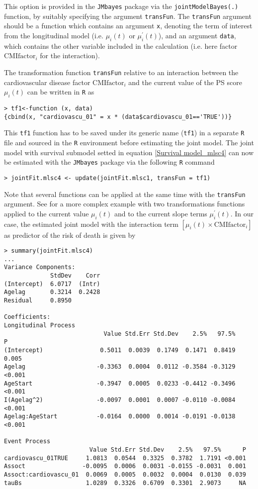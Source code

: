 \documentclass[12pt]{article}
\begin{document}
This option is provided in the \texttt{JMbayes} package via the \texttt{jointModelBayes(.)} function, by suitably specifying the argument \texttt{transFun}. The \texttt{transFun} argument should be a function which contains an argument \texttt{x}, denoting the term of interest from the longitudinal model (i.e. $\mu_i(t)$ or $\mu_i^{'}(t)$), and an
argument \texttt{data}, which contains the other variable included in the calculation (i.e. here factor $\text{CMIfactor}_i$ for the interaction).

The transformation function \texttt{transFun} relative to an interaction between the cardiovascular disease factor $\text{CMIfactor}_i$ and the current value of the PS score $\mu_i(t)$ can be written in \texttt{R} as
\begin{verbatim}
> tf1<-function (x, data)
{cbind(x, "cardiovascu_01" = x * (data$cardiovascu_01=='TRUE'))}
\end{verbatim}
This \texttt{tf1} function has to be saved under its generic name (\texttt{tf1}) in a separate \texttt{R} file and sourced in the \texttt{R} environment before estimating the joint model.
The joint model with survival submodel setted in equation \eqref{Survival model_mlsc4} can now be estimated with the \texttt{JMbayes} package via the following \texttt{R} command
\begin{verbatim}
> jointFit.mlsc4 <- update(jointFit.mlsc1, transFun = tf1)
\end{verbatim}
Note that several functions can be applied at the same time with the \texttt{transFun} argument. See \cite{JMbayes} for a more complex example with two transformations functions applied to the current value $\mu_i(t)$ and to the current slope terms $\mu_i^{'}(t)$.
In our case, the estimated joint model with the interaction term $[\mu_i(t) \times \text{CMIfactor}_i]$ as predictor of the risk of death is given by
\begin{verbatim}
> summary(jointFit.mlsc4)
...
Variance Components:
             StdDev    Corr
(Intercept)  6.0717  (Intr)
Agelag       0.3214  0.2428
Residual     0.8950

Coefficients:
Longitudinal Process
                            Value Std.Err Std.Dev    2.5%   97.5%      P
(Intercept)                0.5011  0.0039  0.1749  0.1471  0.8419  0.005
Agelag                    -0.3363  0.0004  0.0112 -0.3584 -0.3129 <0.001
AgeStart                  -0.3947  0.0005  0.0233 -0.4412 -0.3496 <0.001
I(Agelag^2)               -0.0097  0.0001  0.0007 -0.0110 -0.0084 <0.001
Agelag:AgeStart           -0.0164  0.0000  0.0014 -0.0191 -0.0138 <0.001

Event Process
                        Value Std.Err Std.Dev    2.5%   97.5%      P
cardiovascu_01TRUE     1.0813  0.0544  0.3325  0.3782  1.7191 <0.001
Assoct                -0.0095  0.0006  0.0031 -0.0155 -0.0031  0.001
Assoct:cardiovascu_01  0.0069  0.0005  0.0032  0.0004  0.0130  0.039
tauBs                  1.0289  0.3326  0.6709  0.3301  2.9073     NA

\end{verbatim}
\end{document}
